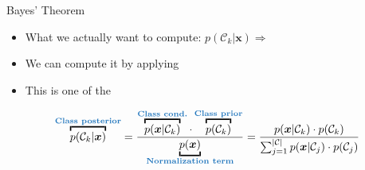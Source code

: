 \begin{frame}{Bayes' Theorem}{}\important
	\begin{itemize}
		\item What we actually want to compute: $p(\mathcal{C}_k \vert \bm{x}) \Rightarrow$
		\item We can compute it by applying 
		\item This is one of the 
	\end{itemize}

	\begin{boxBlue}
		\begin{equation}
			\overbracket{p(\mathcal{C}_k \vert \bm{x})}^{\text{\highlight{Class posterior}}}
				= \frac{
					\overbracket{p(\bm{x} \vert \mathcal{C}_k)}^{\text{\highlight{Class cond.}}}
					\cdot
					\overbracket{p(\mathcal{C}_k)}^{\text{\highlight{Class prior}}}
				}{
					\underbracket{p(\bm{x})}_{\text{\highlight{Normalization term}}}
				}
				= \frac{
					p(\bm{x} \vert \mathcal{C}_k) \cdot p(\mathcal{C}_k)
				}{
					\sum_{j=1}^{\vert \mathcal{C} \vert} p(\bm{x} \vert \mathcal{C}_j) \cdot p(\mathcal{C}_j)
				}
		\end{equation}
	\end{boxBlue}
\end{frame}


